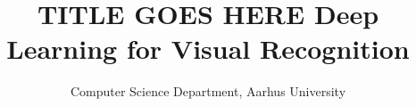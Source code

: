
\usepackage{natbib}

\title{
    \vspace{5cm}
    \Large{\textsc{TITLE GOES HERE}}
    \linebreak
    \Large{Deep Learning for Visual Recognition}
}
\author{Computer Science Department, Aarhus University}





% 
% 

